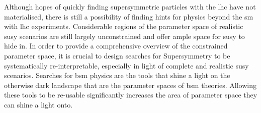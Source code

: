  Although hopes of quickly finding supersymmetric particles with the \gls{lhc} have not materialised, there is still a possibility of finding hints for physics beyond the \gls{sm} with \gls{lhc} experiments. Considerable regions of the parameter space of realistic \gls{susy} scenarios are still largely unconstrained and offer ample space for \gls{susy} to hide in. In order to provide a comprehensive overview of the constrained parameter space, it is crucial to design searches for Supersymmetry to be systematically re-interpretable, especially in light of complete and realistic \gls{susy} scenarios. Searches for \gls{bsm} physics are the tools that shine a light on the otherwise dark landscape that are the parameter spaces of \gls{bsm} theories. Allowing these tools to be re-usable significantly increases the area of parameter space they can shine a light onto.    
 